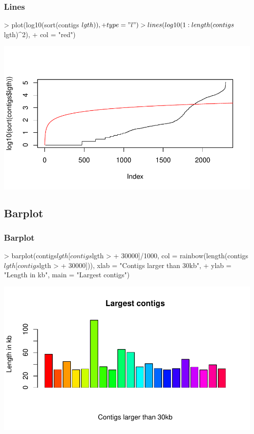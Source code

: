 \begin{frame}
  \frametitle{Lines}
  \scriptsize 
\begin{Schunk}
\begin{Sinput}
> plot(log10(sort(contigs$lgth)), 
+     type = "l")
> lines(log10(1:length(contigs$lgth)^2), 
+     col = "red")
\end{Sinput}
\end{Schunk}
\includegraphics{plots/figura-025}
\normalsize
\end{frame}

\subsection{Barplot}

\begin{frame}
  \frametitle{Barplot}
  \scriptsize 
\begin{Schunk}
\begin{Sinput}
> barplot(contigs$lgth[contigs$lgth > 
+     30000]/1000, col = rainbow(length(contigs$lgth[contigs$lgth > 
+     30000])), xlab = "Contigs larger than 30kb", 
+     ylab = "Length in kb", main = "Largest contigs")
\end{Sinput}
\end{Schunk}
\includegraphics{plots/figura-026}
\normalsize
\end{frame}

